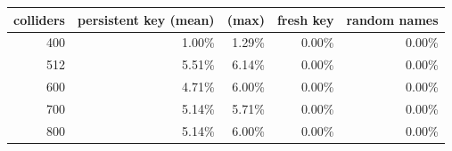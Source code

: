\begin{tabular}{|r|r|r|r|r|}
\hline
colliders & persistent key (mean) & (max) & fresh key & random names \\
\hline
400 & 1.00\% & 1.29\% & 0.00\% & 0.00\% \\
512 & 5.51\% & 6.14\% & 0.00\% & 0.00\% \\
600 & 4.71\% & 6.00\% & 0.00\% & 0.00\% \\
700 & 5.14\% & 5.71\% & 0.00\% & 0.00\% \\
800 & 5.14\% & 6.00\% & 0.00\% & 0.00\% \\
\hline
\end{tabular}
